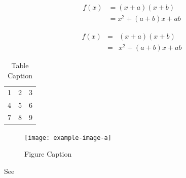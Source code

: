 \documentclass[preprint,12pt]{elsarticle}
\begin{document}
\begin{align*}
 f(x) &= (x+a)(x+b) \\
      &= x^2 + (a+b)x + ab
\end{align*}

\begin{eqnarray*}
 f(x)&=& (x+a)(x+b) \\
     &=& x^2 + (a+b)x + ab
\end{eqnarray*}


\begin{table}[t]%
\centering%
\begin{tabular}{l c r}%
  1 & 2 & 3 \\ %
  4 & 5 & 6 \\
  7 & 8 & 9 \\
\end{tabular}
\caption{Table Caption}\label{fig1}
\end{table}


\begin{figure}[t]%
\centering%
\texttt{[image: example-image-a]}
\caption{Figure Caption}\label{fig1}
\end{figure}


See \cite{Blondeletal2008}

\end{document}
